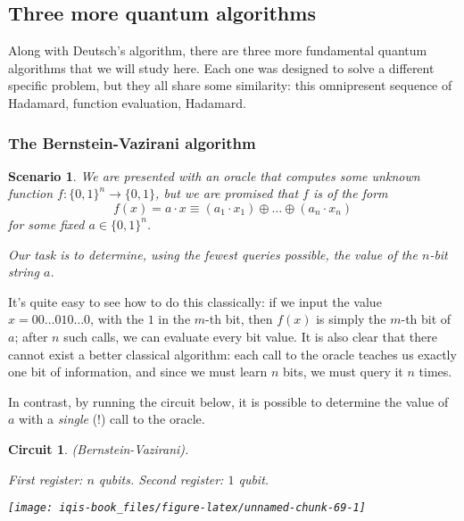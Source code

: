 \documentclass[fleqn]{article}
\newtheorem*{scenario}{Scenario}
\newtheorem*{circuit}{Circuit}
\begin{document}
\hypertarget{three-more-quantum-algorithms}{%
\subsection{Three more quantum algorithms}\label{three-more-quantum-algorithms}}

Along with Deutsch's algorithm, there are three more fundamental quantum algorithms that we will study here.
Each one was designed to solve a different specific problem, but they all share some similarity: this omnipresent sequence of Hadamard, function evaluation, Hadamard.

\hypertarget{the-bernstein-vazirani-algorithm}{%
\subsubsection{The Bernstein-Vazirani algorithm}\label{the-bernstein-vazirani-algorithm}}

\begin{scenario}
We are presented with an oracle that computes some unknown function \(f\colon\{0,1\}^n\to\{0,1\}\), but we are promised that \(f\) is of the form
\[
  f(x) = a\cdot x
  \equiv (a_1\cdot x_1) \oplus \ldots \oplus (a_n\cdot x_n)
\]
for some fixed \(a\in\{0,1\}^n\).

Our task is to determine, using the fewest queries possible, the value of the \(n\)-bit string \(a\).

\end{scenario}

It's quite easy to see how to do this classically: if we input the value \(x=00\ldots010\ldots0\), with the \(1\) in the \(m\)-th bit, then \(f(x)\) is simply the \(m\)-th bit of \(a\); after \(n\) such calls, we can evaluate every bit value.
It is also clear that there cannot exist a better classical algorithm: each call to the oracle teaches us exactly one bit of information, and since we must learn \(n\) bits, we must query it \(n\) times.

In contrast, by running the circuit below, it is possible to determine the value of \(a\) with a \emph{single} (!) call to the oracle.

\begin{circuit}

(Bernstein-Vazirani).

\emph{First register: \(n\) qubits. Second register: \(1\) qubit.}

\begin{center}\texttt{[image: iqis-book\_files/figure-latex/unnamed-chunk-69-1]} \end{center}


\end{circuit}
\end{document}

